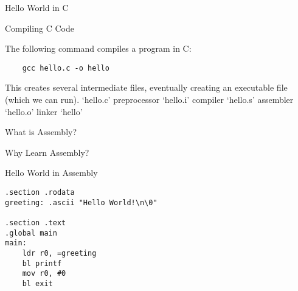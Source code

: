 

\begin{frame}{Hello World in C}
\end{frame}


\begin{frame}[fragile]{Compiling C Code}

The following command compiles a program in C:

\begin{verbatim}
    gcc hello.c -o hello
\end{verbatim}

This creates several intermediate files, eventually creating an executable file (which we can run).
`hello.c'
preprocessor
`hello.i'
compiler
`hello.s'
assembler
`hello.o'
linker
`hello'

\end{frame}




\begin{frame}{What is Assembly?}
\end{frame}


\begin{frame}{Why Learn Assembly?}
\end{frame}


\begin{frame}[fragile]{Hello World in Assembly}

    \begin{verbatim}
.section .rodata
greeting: .ascii "Hello World!\n\0"

.section .text
.global main
main:
    ldr r0, =greeting
    bl printf
    mov r0, #0
    bl exit
\end{verbatim}
\end{frame}















